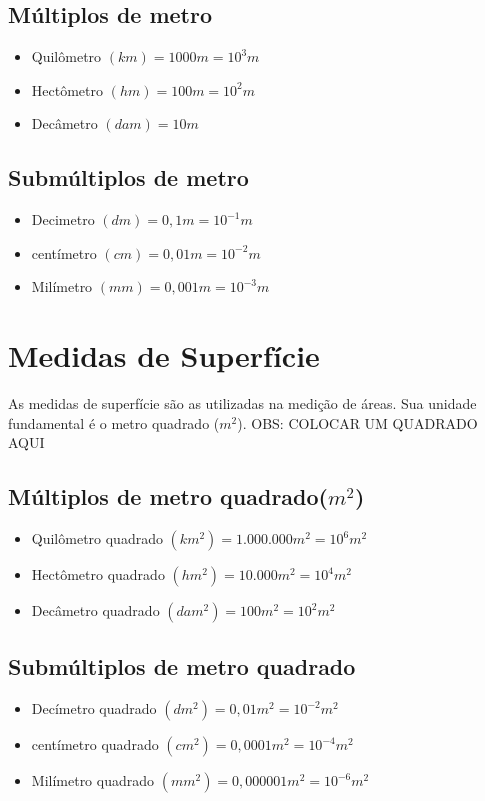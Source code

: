 \documentclass[11pt,fleqn]{book}
\begin{document}
	\subsection{Múltiplos de metro}
		\begin{itemize}
			\item Quilômetro $(km) = 1000m = 10^3m$
			\item Hectômetro $(hm) = 100m = 10^2m$
			\item Decâmetro $(dam) = 10m$ 
			
		\end{itemize}

	\subsection{Submúltiplos de metro}
		\begin{itemize}
			\item Decimetro $(dm) = 0,1m = 10^{-1}m$
			\item centímetro $(cm) = 0,01m = 10^{-2}m$
			\item Milímetro $(mm) = 0,001m = 10^{-3}m$
		\end{itemize}
\section{Medidas de Superfície}
As medidas de superfície são as utilizadas na medição de
áreas. Sua unidade fundamental é o metro quadrado ($m^2$).
OBS: COLOCAR UM QUADRADO AQUI
	\subsection{Múltiplos de metro quadrado($m^2$)}
		\begin{itemize}
			\item Quilômetro quadrado $(km^2) = 1.000.000 m^2 = 10^6 m^2$
			\item Hectômetro quadrado $(hm^2) = 10.000 m^2 = 10^4 m^2$
			\item Decâmetro quadrado $(dam^2) = 100 m^2 = 10^2 m^2$
		\end{itemize}

	\subsection{Submúltiplos de metro quadrado}
		\begin{itemize}
			\item Decímetro quadrado $(dm^2) = 0,01m^2 = 10^{-2}m^2$
			\item centímetro quadrado $(cm^2) = 0,0001m^2 = 10^{-4}m^2$
			\item Milímetro quadrado $(mm^2)= 0,000001m^2 = 10^{-6}m^2$
		\end{itemize}
	
\end{document}
